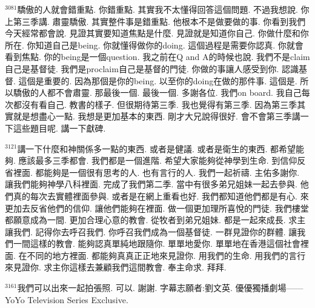 \documentclass{book}
\begin{document}
$^{3081}$驕傲的人就會錯重點.
你錯重點.
其實我不太懂得回答這個問題.
不過我想說.
你上第三季講.
肅靈驕傲.
其實整件事是錯重點.
他根本不是做要做的事.
你看到我們今天經常都會說.
見證其實要知道焦點是什麼.
見證就是知道你自己.
你做什麼和你所在.
你知道自己是being.
你就懂得做你的doing.
這個過程是需要你認真.
你就會看到焦點.
你的being是一個question.
我之前在Q and A的時候也說.
我們不是claim自己是基督徒.
我們是proclaim自己是基督的門徒.
你做的事讓人感受到你.
認識基督.
這個是重要的.
因為那個是你的being.
以至你的doing在做的那件事.
這個是.
所以驕傲的人都不會肅靈.
那最後一個.
最後一個.
多謝各位.
我們on board.
我自己每次都沒有看自己.
教書的樣子.
但很期待第三季.
我也覺得有第三季.
因為第三季其實就是想盡心一點.
我想是更加基本的東西.
剛才大兄說得很好.
會不會第三季講一下這些題目呢.
講一下獻碑.

$^{3121}$講一下什麼和神關係多一點的東西.
或者是健議.
或者是衛生的東西.
都希望能夠.
應該最多三季都會.
我們都是一個進階.
希望大家能夠從神學到生命.
到信仰反省裡面.
都能夠是一個很有思考的人.
也有言行的人.
我們一起祈禱.
主佑多謝你.
讓我們能夠神學八科裡面.
完成了我們第二季.
當中有很多弟兄姐妹一起去參與.
他們真的每次去實體裡面參與.
或者是在網上重看也好.
我們都知道他們都是有心.
來更加去反省他們的信仰.
讓他們能夠在裡面.
做一個更加理所喜悅的門徒.
我們樓堂都願意成為一間.
更加合理心意的教會.
從牧者到弟兄姐妹.
都是一起來成長.
求主讓我們.
記得你去呼召我們.
你呼召我們成為一個基督徒.
一群見證你的群體.
讓我們一間這樣的教會.
能夠認真單純地跟隨你.
單單地愛你.
單單地在香港這個社會裡面.
在不同的地方裡面.
都能夠真真正正地來見證你.
用我們的生命.
用我們的言行來見證你.
求主你這樣去兼顧我們這間教會.
奉主命求.
拜拜.

$^{3161}$我們可以出來一起拍張照.
可以.
謝謝.
字幕志願者:劉文英.
優優獨播劇場——YoYo Television Series Exclusive.
\newpage
\end{document}

